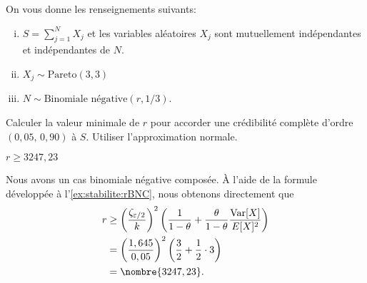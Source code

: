\begin{exercice}
  On vous donne les renseignements suivants:
  \begin{enumerate}[i)]
  \item $S = \sum_{j=1}^{N} X_j$ et les variables aléatoires
    $X_j$ sont mutuellement indépendantes et indépendantes de $N$.
  \item $X_j \sim \text{Pareto}(3, 3)$
  \item $N \sim \text{Binomiale négative}(r, 1/3)$.
  \end{enumerate}
  Calculer la valeur minimale de $r$ pour accorder une crédibilité
  complète d'ordre $(0,05,\, 0,90)$ à $S$. Utiliser l'approximation
  normale.
  \begin{rep}
    $r \geq 3247,23$
  \end{rep}
  \begin{sol}
    Nous avons un cas binomiale négative composée. À l'aide de la
    formule développée à l'\autoref{ex:stabilite:rBNC}, nous obtenons
    directement que
    \begin{align*}
      r
      &\geq
      \left(
        \frac{\zeta_{\varepsilon/2}}{k}
      \right)^2
      \left(
        \frac{1}{1 - \theta} +
        \frac{\theta}{1-\theta} \frac{\var{X}}{\esp{X}^2}
      \right) \\
      &=
      \left(
        \frac{1,645}{0,05}
      \right)^2
      \left(
        \frac{3}{2} + \frac{1}{2} \cdot 3
      \right) \\
      &= \nombre{3247,23}.
    \end{align*}
  \end{sol}
\end{exercice}


